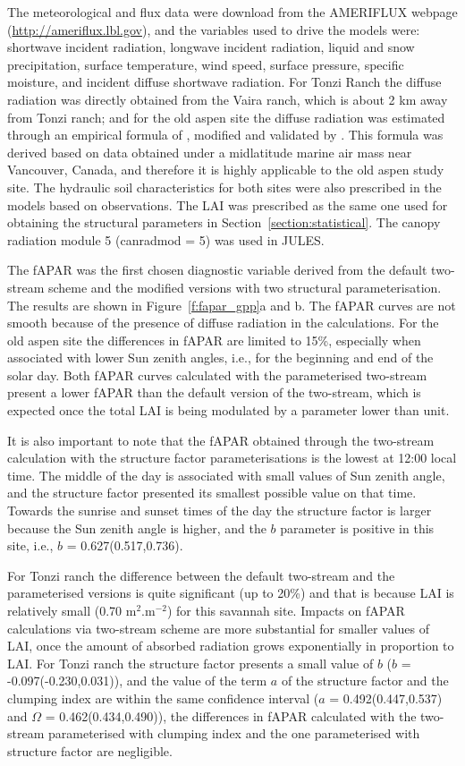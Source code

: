The meteorological and flux data were download from the AMERIFLUX webpage (\url{http://ameriflux.lbl.gov}), and the variables used to drive the models were: shortwave incident radiation, longwave incident radiation, liquid and snow precipitation, surface temperature, wind speed, surface pressure, specific moisture, and incident diffuse shortwave radiation. For Tonzi Ranch the diffuse radiation was directly obtained from the Vaira ranch, which is about 2 km away from Tonzi ranch; and for the old aspen site the diffuse radiation was estimated through an empirical formula of \citet{Erbs1982}, modified and validated by \citet{Black1991}. This formula was derived based on data obtained under a midlatitude marine air mass near Vancouver, Canada, and therefore it is highly applicable to the old aspen study site. The hydraulic soil characteristics for both sites were also prescribed in the models based on observations. The LAI was prescribed as the same one used for obtaining the structural parameters in Section~\ref{section:statistical}. The canopy radiation module 5 (can\textunderscore rad\textunderscore mod = 5) was used in JULES.

The fAPAR was the first chosen diagnostic variable derived from the default two-stream scheme and the modified versions with two structural parameterisation. The results are shown in Figure~\ref{f:fapar_gpp}a and b. The fAPAR curves are not smooth because of the presence of diffuse radiation in the calculations. For the old aspen site the differences in fAPAR are limited to 15\%, especially when associated with lower Sun zenith angles, i.e., for the beginning and end of the solar day. Both fAPAR curves calculated with the parameterised two-stream present a lower fAPAR than the default version of the two-stream, which is expected once the total LAI is being modulated by a parameter lower than unit. 

It is also important to note that the fAPAR obtained through the two-stream calculation with the structure factor parameterisations is the lowest at 12:00 local time. The middle of the day is associated with small values of Sun zenith angle, and the structure factor presented its smallest possible value on that time. Towards the sunrise and sunset times of the day the structure factor is larger because the Sun zenith angle is higher, and the $b$ parameter is positive in this site, i.e., $b$ = 0.627(0.517,0.736).

For Tonzi ranch the difference between the default two-stream and the parameterised versions is quite significant (up to 20\%) and that is because LAI is relatively small (0.70 m$^2$.m$^{-2}$) for this savannah site. Impacts on fAPAR calculations via two-stream scheme are more substantial for smaller values of LAI, once the amount of absorbed radiation grows exponentially in proportion to LAI. For Tonzi ranch the structure factor presents a small value of $b$ ($b$ = -0.097(-0.230,0.031)), and the value of the term $a$ of the structure factor and the clumping index are within the same confidence interval ($a$ = 0.492(0.447,0.537) and $\Omega$ = 0.462(0.434,0.490)), the differences in fAPAR calculated with the two-stream parameterised with clumping index and the one parameterised with structure factor are negligible.

